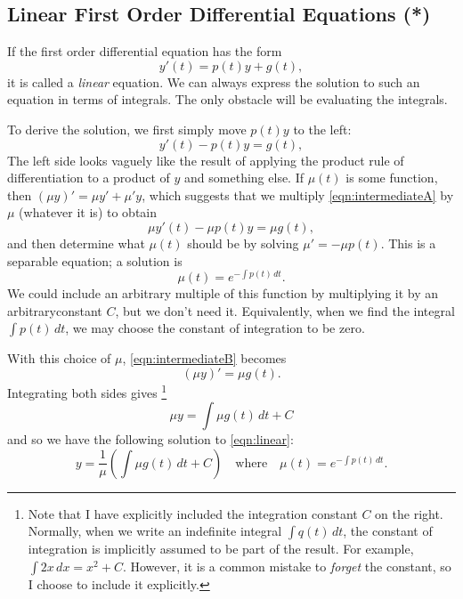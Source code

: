 \documentclass{book}
\begin{document}
\subsection{Linear First Order Differential Equations (*)}

If the first order differential equation has the form
\begin{equation}
    y'(t) = p(t) y + g(t),
\label{eqn:linear}
\end{equation}
it is called a \emph{linear} equation.
We can always express the solution to such an equation
in terms of integrals.  The only obstacle will be
evaluating the integrals.

To derive the solution, we first simply move $p(t)y$ to the left:
\begin{equation}
    y'(t) - p(t) y =  g(t),
\label{eqn:intermediateA}
\end{equation}
The left side looks vaguely like the result of applying the
product rule of differentiation to a product of $y$ and something else.
If $\mu(t)$ is some function, then $(\mu y)' = \mu y' + \mu' y$,
which suggests that we multiply \eqref{eqn:intermediateA}
by $\mu$ (whatever it is)
to obtain
\begin{equation}
    \mu y'(t) - \mu p(t) y =  \mu g(t),
\label{eqn:intermediateB}
\end{equation}
and then determine what $\mu(t)$ should
be by solving $\mu' = -\mu p(t)$.
This is a separable equation; a solution is
\begin{equation}
   \mu(t) = e^{-\int p(t)\, dt}.
\end{equation}
We could include an arbitrary multiple of this function
by multiplying it by an arbitraryconstant $C$, but we
don't need it.  Equivalently, when we find the integral
$\int p(t)\,dt$, we may choose the constant of integration
to be zero.

With this choice of $\mu$, 
\eqref{eqn:intermediateB} becomes
\begin{equation}
    (\mu y)' =  \mu g(t).
\label{eqn:intermediateC}
\end{equation}
Integrating both sides gives%
\footnote{Note that I have explicitly included the integration
constant $C$ on the right.  Normally, when we write an indefinite
integral $\int q(t)\, dt$, the constant of integration is implicitly
assumed to be part of the result. For example, $\int 2x\,dx = x^2+C$.
However, it is a common mistake to \emph{forget} the constant, so
I choose to include it explicitly.}
\begin{equation}
    \mu y =  \int \mu g(t) \, dt + C
\label{eqn:intermediateD}
\end{equation}
and so we have the following solution
to \eqref{eqn:linear}:
\begin{equation}
    y =  \frac{1}{\mu}\left(\int \mu g(t) \, dt + C\right)
    \quad \textrm{where} \quad
    \mu(t) = e^{-\int p(t)\, dt}.
\label{eqn:linearsolution}
\end{equation}
\end{document}
